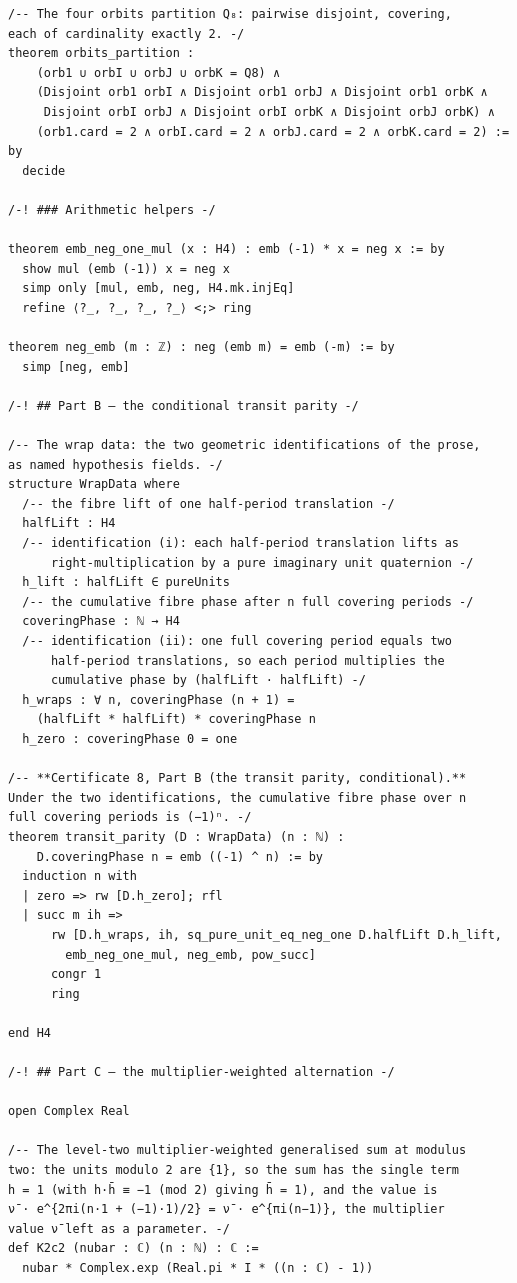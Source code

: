 \documentclass[11pt,a4paper]{article}
\theoremstyle{plain}
\theoremstyle{definition}
\theoremstyle{remark}
\begin{document}
\begin{Verbatim}[fontsize=\footnotesize,breaklines=true,breakanywhere=true,formatcom=\leanmono]
/-- The four orbits partition Q₈: pairwise disjoint, covering,
each of cardinality exactly 2. -/
theorem orbits_partition :
    (orb1 ∪ orbI ∪ orbJ ∪ orbK = Q8) ∧
    (Disjoint orb1 orbI ∧ Disjoint orb1 orbJ ∧ Disjoint orb1 orbK ∧
     Disjoint orbI orbJ ∧ Disjoint orbI orbK ∧ Disjoint orbJ orbK) ∧
    (orb1.card = 2 ∧ orbI.card = 2 ∧ orbJ.card = 2 ∧ orbK.card = 2) := by
  decide

/-! ### Arithmetic helpers -/

theorem emb_neg_one_mul (x : H4) : emb (-1) * x = neg x := by
  show mul (emb (-1)) x = neg x
  simp only [mul, emb, neg, H4.mk.injEq]
  refine ⟨?_, ?_, ?_, ?_⟩ <;> ring

theorem neg_emb (m : ℤ) : neg (emb m) = emb (-m) := by
  simp [neg, emb]

/-! ## Part B — the conditional transit parity -/

/-- The wrap data: the two geometric identifications of the prose,
as named hypothesis fields. -/
structure WrapData where
  /-- the fibre lift of one half-period translation -/
  halfLift : H4
  /-- identification (i): each half-period translation lifts as
      right-multiplication by a pure imaginary unit quaternion -/
  h_lift : halfLift ∈ pureUnits
  /-- the cumulative fibre phase after n full covering periods -/
  coveringPhase : ℕ → H4
  /-- identification (ii): one full covering period equals two
      half-period translations, so each period multiplies the
      cumulative phase by (halfLift · halfLift) -/
  h_wraps : ∀ n, coveringPhase (n + 1) =
    (halfLift * halfLift) * coveringPhase n
  h_zero : coveringPhase 0 = one

/-- **Certificate 8, Part B (the transit parity, conditional).**
Under the two identifications, the cumulative fibre phase over n
full covering periods is (−1)ⁿ. -/
theorem transit_parity (D : WrapData) (n : ℕ) :
    D.coveringPhase n = emb ((-1) ^ n) := by
  induction n with
  | zero => rw [D.h_zero]; rfl
  | succ m ih =>
      rw [D.h_wraps, ih, sq_pure_unit_eq_neg_one D.halfLift D.h_lift,
        emb_neg_one_mul, neg_emb, pow_succ]
      congr 1
      ring

end H4

/-! ## Part C — the multiplier-weighted alternation -/

open Complex Real

/-- The level-two multiplier-weighted generalised sum at modulus
two: the units modulo 2 are {1}, so the sum has the single term
h = 1 (with h·h̄ ≡ −1 (mod 2) giving h̄ = 1), and the value is
ν̄ · e^{2πi(n·1 + (−1)·1)/2} = ν̄ · e^{πi(n−1)}, the multiplier
value ν̄ left as a parameter. -/
def K2c2 (nubar : ℂ) (n : ℕ) : ℂ :=
  nubar * Complex.exp (Real.pi * I * ((n : ℂ) - 1))


\end{Verbatim}
\end{document}
